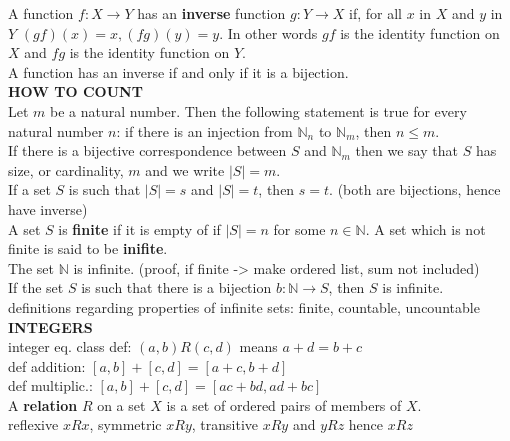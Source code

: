 \documentclass[10pt,landscape]{article}
\begin{document}
\begin{multicols}{4}
A function $f : X \to Y$ has an \textbf{inverse} function $g : Y \to
X$ if, for all $x$ in $X$ and $y$ in $Y$ $(gf)(x) = x, (fg)(y) =
y$. In other words $gf$ is the identity function on $X$ and $fg$ is
the identity function on $Y$.\\

A function has an inverse if and only if it is a bijection.\\

\textbf{HOW TO COUNT}\\
Let $m$ be a natural number. Then the following statement is true for
every natural number $n$: if there is an injection from $\mathbb{N}_n$
to $\mathbb{N}_m$, then $n \leq m$.\\ 

If there is a bijective correspondence between $S$ and $\mathbb{N}_m$
then we say that $S$ has size, or cardinality, $m$ and we write $|S| =
m$.\\

If a set $S$ is such that $|S| = s$ and $|S| = t$, then $s = t$. (both
are bijections, hence have inverse)\\

A set $S$ is \textbf{finite} if it is empty of if $|S| = n$ for some
$n \in \mathbb{N}$. A set which is not finite is said to be
\textbf{inifite}.\\

The set $\mathbb{N}$ is infinite. (proof, if finite -> make ordered
list, sum not included) \\


If the set $S$ is such that there is a bijection $b : \mathbb{N} \to
S$, then $S$ is infinite.\\

definitions regarding properties of infinite sets: finite, countable,
uncountable\\


\textbf{INTEGERS}\\
integer eq. class def: $(a,b)R(c,d)$ means $a + d = b + c$\\
def addition: $[a,b] + [c,d] = [a + c, b + d]$\\
def multiplic.: $[a,b] + [c,d] = [ac + bd, ad + bc]$\\

A \textbf{relation} $R$ on a set $X$ is a set of ordered pairs of
members of $X$.\\


reflexive $xRx$, symmetric $xRy$, transitive $xRy$ and $yRz$ hence
$xRz$\\


\end{multicols}
\end{document}

